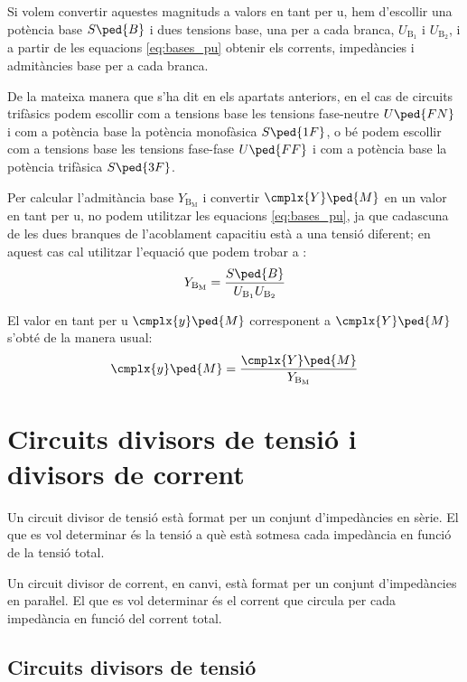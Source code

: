 Si volem convertir aquestes magnituds a valors en tant per u, hem d'escollir  una potència base $S\ped{B}$ i dues tensions base, una  per a cada branca, $U_{\text{B}_1}$ i  $U_{\text{B}_2}$, i a partir de les equacions \eqref{eq:bases_pu} obtenir els corrents, impedàncies i admitàncies base per a cada branca.

De la mateixa manera que s'ha dit en els apartats anteriors, en el cas de circuits trifàsics podem escollir com a tensions base les tensions fase-neutre $U\ped{FN}$ i com a potència base la potència  monofàsica $S\ped{1F}$, o bé podem escollir com a tensions base les tensions fase-fase $U\ped{FF}$ i com a potència base la potència trifàsica $S\ped{3F}$.


Per  calcular l'admitància base $Y_{\text{B}_\text{M}}$ i convertir $\cmplx{Y}\ped{M}$ en un valor en tant per u, no podem utilitzar les equacions \eqref{eq:bases_pu}, ja que cadascuna de les dues branques de l'acoblament capacitiu està a una tensió diferent; en aquest cas cal utilitzar l'equació que podem trobar a \cite{TLE}:
\begin{equation}
    Y_{\text{B}_\text{M}} = \frac{S\ped{B}}{U_{\text{B}_1} U_{\text{B}_2}}
\end{equation}

El valor en tant per u $\cmplx{y}\ped{M}$ corresponent a $\cmplx{Y}\ped{M}$ s'obté de la manera usual:
\begin{equation}
    \cmplx{y}\ped{M} = \frac{\cmplx{Y}\ped{M}}{Y_{\text{B}_\text{M}}}
\end{equation}


\section{Circuits divisors de tensió i divisors de corrent}\label{sec:div_tens_corr}

Un circuit divisor de tensió està format per un conjunt
d'impedàncies en sèrie. El que es vol determinar  és  la
tensió a què està sotmesa cada impedància en funció de la tensió total.

Un circuit divisor de corrent, en canvi, està format per un conjunt
d'impedàncies en paraŀlel. El que es vol determinar és el
corrent que circula per cada impedància en funció del corrent
total.

\subsection{Circuits divisors de tensió}\label{sec:circ-div-tens}

